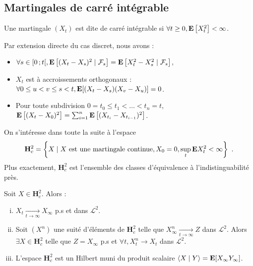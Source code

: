 \subsection{Martingales de carré intégrable}

	\begin{defn}
		Une martingale $(X_t)$ est dite de carré intégrable si $\forall t \geq 0, \mathbf{E} \left[ X_t^2 \right] < \infty$.
	\end{defn}
	
	Par extension directe du cas discret, nous avons :
	\begin{itemize}
		\item[\textbullet] $\forall s \in \mathopen{}\mathclose{\left[0\mathclose{}\mathpunct{};t\right[}, \mathbf{E} \left[ (X_t - X_s)^2 \mid \mathcal{F}_s \right] = \mathbf{E} \left[ X_t^2 - X_s^2 \mid \mathcal{F}_s \right]$,
		\item[\textbullet] $X_t$ est à accroissements orthogonaux : $\forall 0 \leq u < v \leq s < t, \mathbf{E} [(X_t - X_s)(X_v - X_u)] = 0$.
		\item[\textbullet] Pour toute subdivision $0 = t_0 \leq t_1 < \ldots < t_n = t$, $\mathbf{E} \left[ (X_t - X_0)^2 \right] = \sum_{i = 1}^n \mathbf{E} \left[ (X_{t_i} - X_{t_{i - 1}})^2 \right]$.
	\end{itemize}
	
	On s'intéresse dans toute la suite à l'espace
	$$\mathbf{H}_c^2 = \left\{ X \mid X\ \text{est une martingale continue}, X_0 = 0, \sup_t \esp X_t^2 < \infty \right\}\ .$$
	Plus exactement, $\mathbf{H}_c^2$ est l'ensemble des classes d'équivalence à l'indistinguabilité près.
	
	\begin{thm}
		Soit $X \in \mathbf{H}_c^2$.
		Alors :
		\begin{enumerate}[(i)]
			\item $X_t \underset{t \to \infty}{\longrightarrow} X_{\infty}$ p.s et dans $\mathcal{L}^2$.
			\item Soit $(X^n)$ une suité d'éléments de $\mathbf{H}_c^2$ telle que $X_\infty^n \underset{t \to \infty}{\longrightarrow} Z$ dans $\mathcal{L}^2$.
				Alors $\exists X \in \mathbf{H}_c^2$ telle que $Z = X_\infty$ p.s et $\forall t, X_t^n \longrightarrow X_t$ dans $\mathcal{L}^2$.
			\item L'espace $\mathbf{H}_c^2$ est un Hilbert muni du produit scalaire $\left\langle X \mid Y \right\rangle = \mathbf{E} [X_\infty Y_\infty]$.
		\end{enumerate}
	\end{thm}



